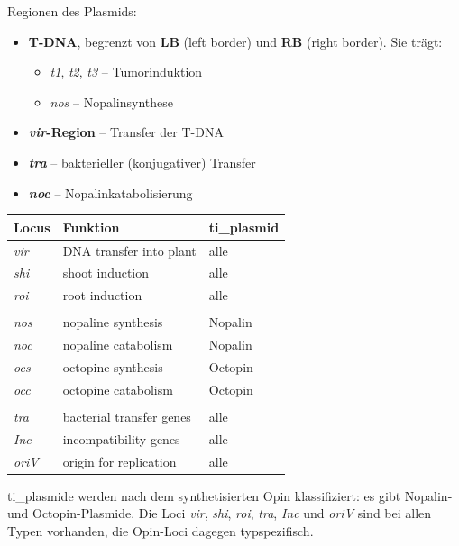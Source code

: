 Regionen des Plasmids:
\begin{itemize}
    \item \textbf{T-DNA}, begrenzt von \textbf{LB} (left border) und \textbf{RB}
    (right border).
    Sie trägt:
    \begin{itemize}
        \item \emph{t1}, \emph{t2}, \emph{t3} -- Tumorinduktion
        \item \emph{nos} -- Nopalinsynthese
    \end{itemize}
    \item \textbf{\emph{vir}-Region} -- Transfer der T-DNA
    \item \textbf{\emph{tra}} -- bakterieller (konjugativer) Transfer
    \item \textbf{\emph{noc}} -- Nopalinkatabolisierung
\end{itemize}

\begin{mytable}
    \caption{Funktionen der Gene der \gls{ti_plasmid}e.}
    \label{tab:tigene}
    \begin{tabular}{@{}lll@{}}
        \hline
        \textbf{Locus} & \textbf{Funktion} & \textbf{\gls{ti_plasmid}} \\
        \hline
        \emph{vir}  & DNA transfer into plant   & alle \\
        \emph{shi}  & shoot induction           & alle \\
        \emph{roi}  & root induction            & alle \\ \\
        \emph{nos}  & nopaline synthesis        & Nopalin \\
        \emph{noc}  & nopaline catabolism       & Nopalin \\
        \emph{ocs}  & octopine synthesis        & Octopin \\
        \emph{occ}  & octopine catabolism       & Octopin \\
       \\
        \emph{tra}  & bacterial transfer genes  & alle \\
        \emph{Inc}  & incompatibility genes     & alle \\
        \emph{oriV} & origin for replication    & alle \\
        \hline
    \end{tabular}
\end{mytable}

\gls{ti_plasmid}e werden nach dem synthetisierten Opin klassifiziert: es gibt
Nopalin- und Octopin-Plasmide.
Die Loci \emph{vir},
\emph{shi}, \emph{roi}, \emph{tra}, \emph{Inc} und \emph{oriV} sind bei allen
Typen vorhanden, die Opin-Loci dagegen typspezifisch.

